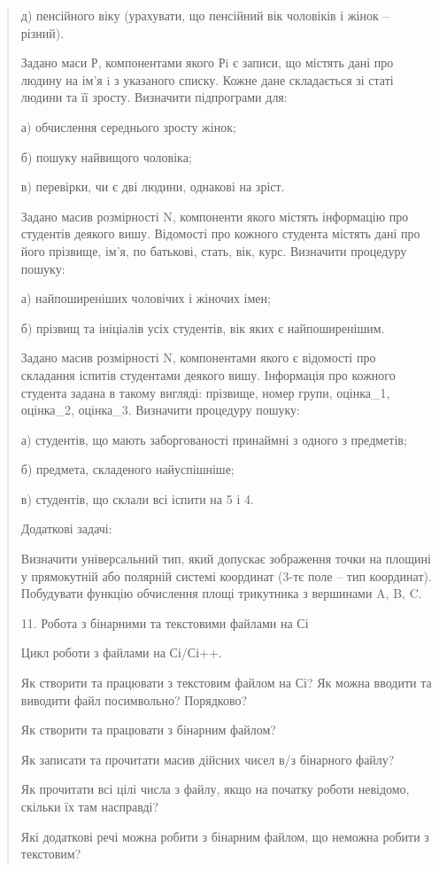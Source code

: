 \documentclass[]{article}
\begin{document}
\begin{quote}
д) пенсійного віку (урахувати, що пенсійний вік чоловіків і жінок --
різний).

Задано маси Р, компонентами якого Рi є записи, що містять дані про
людину на ім'я i з указаного списку. Кожне дане складається зі статі
людини та її зросту. Визначити підпрограми для:

а) обчислення середнього зросту жінок;

б) пошуку найвищого чоловіка;

в) перевірки, чи є дві людини, однакові на зріст.

Задано масив розмірності N, компоненти якого містять інформацію про
студентів деякого вишу. Відомості про кожного студента містять дані про
його прізвище, ім'я, по батькові, стать, вік, курс. Визначити процедуру
пошуку:

а) найпоширеніших чоловічих і жіночих імен;

б) прізвищ та ініціалів усіх студентів, вік яких є найпоширенішим.

Задано масив розмірності N, компонентами якого є відомості про складання
іспитів студентами деякого вишу. Інформація про кожного студента задана
в такому вигляді: прізвище, номер групи, оцінка\_1, оцінка\_2,
оцінка\_3. Визначити процедуру пошуку:

а) студентів, що мають заборгованості принаймні з одного з предметів;

б) предмета, складеного найуспішніше;

в) студентів, що склали всі іспити на 5 і 4.

Додаткові задачі:

Визначити універсальний тип, який допускає зображення точки на площині у
прямокутній або полярній системі координат (3-тє поле -- тип координат).
Побудувати функцію обчислення площі трикутника з вершинами A, B, C.

11. Робота з бінарними та текстовими файлами на Сі

Цикл роботи з файлами на Сі/Сі++.

Як створити та працювати з текстовим файлом на Сі? Як можна вводити та
виводити файл посимвольно? Порядково?

Як створити та працювати з бінарним файлом?

Як записати та прочитати масив дійсних чисел в/з бінарного файлу?

Як прочитати всі цілі числа з файлу, якщо на початку роботи невідомо,
скільки їх там насправді?

Які додаткові речі можна робити з бінарним файлом, що неможна робити з
текстовим?


\end{quote}
\end{document}
